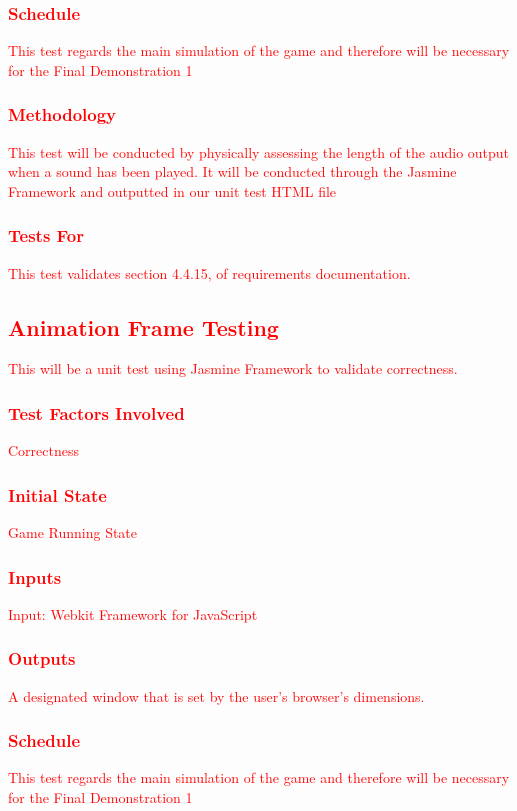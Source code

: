 \documentclass[11pt, oneside]{article}   	%
\begin{document}
\subsubsection{\textcolor{red}{Schedule}}
\textcolor{red}{This test regards the main simulation of the game and therefore will be necessary for the Final Demonstration 1}
\subsubsection{\textcolor{red}{Methodology}}
\textcolor{red}{This test will be conducted by physically assessing the length of the audio output when a sound has been played. It will be conducted through the Jasmine Framework and outputted in our unit test HTML file}
\subsubsection{\textcolor{red}{Tests For}}
\textcolor{red}{This test validates section 4.4.15, of requirements documentation.}


\subsection{\textcolor{red}{Animation Frame Testing}}
\textcolor{red}{This will be a unit test using Jasmine Framework to validate correctness.}
\subsubsection{\textcolor{red}{Test Factors Involved}}
\textcolor{red}{Correctness}
\subsubsection{\textcolor{red}{Initial State}}
\textcolor{red}{Game Running State}
\subsubsection{\textcolor{red}{Inputs}}
\textcolor{red}{Input: Webkit Framework for JavaScript}
\subsubsection{\textcolor{red}{Outputs}}
\textcolor{red}{A designated window that is set by the user's browser's dimensions.}
\subsubsection{\textcolor{red}{Schedule}}
\textcolor{red}{This test regards the main simulation of the game and therefore will be necessary for the Final Demonstration 1}
\end{document}
